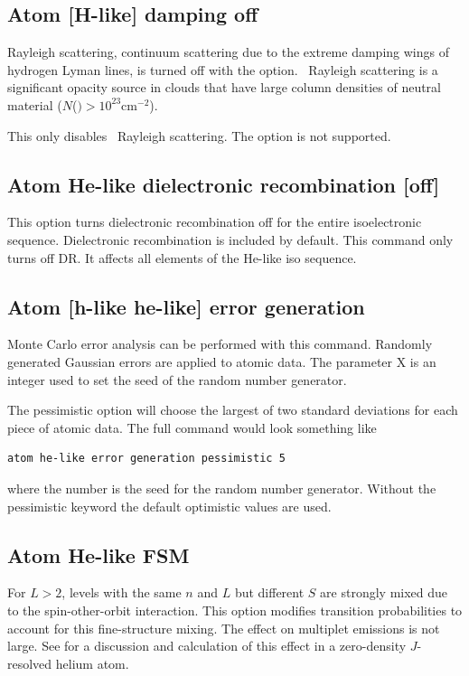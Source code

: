 \subsection{Atom [H-like] damping off}

Rayleigh scattering, continuum scattering due to the extreme damping
wings of hydrogen Lyman lines, is turned off with the  option.
\hi\  Rayleigh scattering is a significant opacity source in clouds that have
large column densities of neutral material
($N$(\hO $) > 10^{23} \mathrm{cm}^{-2}$).

This only disables \hi\ Rayleigh scattering.  
The  option is not supported. 

\subsection{Atom He-like dielectronic recombination [off] }

This option turns dielectronic recombination off for the entire
isoelectronic sequence.
Dielectronic recombination is included by default.
This command only turns off DR.
It affects all elements of the He-like iso sequence.

\subsection{Atom [h-like \OR{} he-like] error generation}

Monte Carlo error analysis can be performed with this command.
Randomly
generated Gaussian errors are applied to atomic data.
The parameter X is
an integer used to set the seed of the random number generator.

The pessimistic option will choose the largest of two standard deviations
for each piece of atomic data.
The full command would look something like
\begin{verbatim}
atom he-like error generation pessimistic 5
\end{verbatim}
where the number is the seed for the random number generator. Without the
pessimistic keyword the default optimistic values are used.

\subsection{Atom He-like FSM}

For $L > 2$, levels with the same $n$ and $L$ but different $S$ are strongly
mixed due to the spin-other-orbit interaction.
This option modifies transition probabilities to account for this fine-structure mixing.
The effect on multiplet emissions is not large.
See \citet{Bauman2005} for a discussion and calculation of this effect 
in a zero-density $J$-resolved helium atom.

